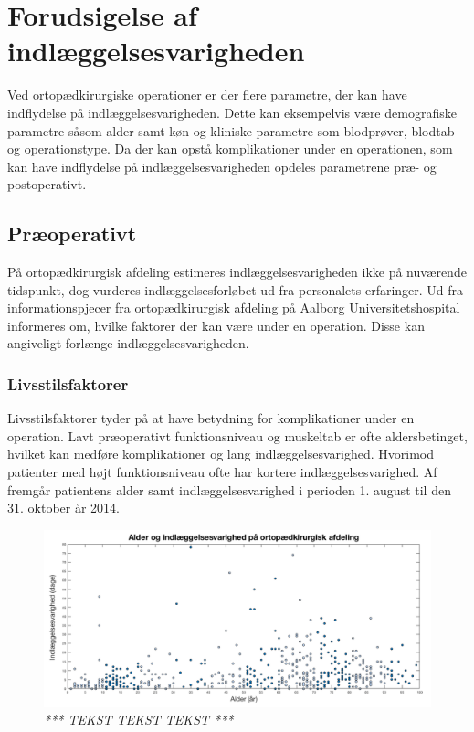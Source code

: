 \section{Forudsigelse af indlæggelsesvarigheden}
Ved ortopædkirurgiske operationer er der flere parametre, der kan have indflydelse på
indlæggelsesvarigheden. Dette kan eksempelvis være demografiske parametre såsom
alder samt køn og kliniske parametre som blodprøver, blodtab og operationstype. Da
der kan opstå komplikationer under en operationen, som kan have indflydelse på
indlæggelsesvarigheden opdeles parametrene præ- og postoperativt.


\subsection{Præoperativt}
På ortopædkirurgisk afdeling estimeres indlæggelsesvarigheden ikke på nuværende tidspunkt, dog vurderes indlæggelsesforløbet ud fra personalets erfaringer. Ud fra informationspjecer fra ortopædkirurgisk afdeling på Aalborg Universitetshospital informeres om, hvilke faktorer der kan være under en operation. Disse kan angiveligt forlænge indlæggelsesvarigheden. 


\subsubsection{Livsstilsfaktorer}
Livsstilsfaktorer tyder på at have betydning for komplikationer under en operation. Lavt præoperativt funktionsniveau og muskeltab er ofte aldersbetinget, hvilket kan medføre komplikationer og lang indlæggelsesvarighed. Hvorimod patienter med højt funktionsniveau ofte har kortere indlæggelsesvarighed.\cite{Kehlet2001, Janssen2002} Af  fremgår patientens alder samt indlæggelsesvarighed i perioden 1. august til den 31. oktober år 2014.


\begin{figure}[H]
	\flushleft 
	\centering
	\includegraphics[scale=0.55]{figures/alderogindlaeg}
	\flushleft
	\caption{\textit{ *** TEKST TEKST TEKST *** }}
	\label{alderogindlaeggelse}
\end{figure}


